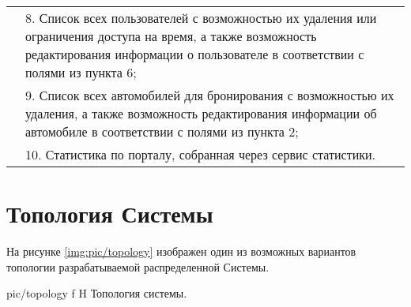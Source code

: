\begin{longtable}{|p{0.5cm}|p{15.5cm}|}
	&
	8. Список всех пользователей с возможностью их удаления или ограничения доступа на время, а также возможность редактирования информации о пользователе в соответствии с полями из пункта 6; \\
	\cline{2-2}
	
	&
	9. Список всех автомобилей для бронирования с возможностью их удаления, а также возможность редактирования информации об автомобиле в соответствии с полями из пункта 2; \\
	\cline{2-2}
	
	&
	10. Статистика по порталу, собранная через сервис статистики.
	\\
	\hline
\end{longtable}

\section{Топология Системы}
На рисунке \ref{img:pic/topology} изображен один из возможных вариантов топологии разрабатываемой распределенной Системы.

{pic/topology}
{f}
{H}
{\textwidth}
{Топология системы.}

